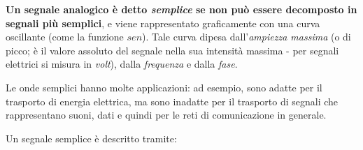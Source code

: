             \textbf{Un segnale analogico è detto \textit{semplice} se non può essere decomposto in segnali più semplici}, e viene rappresentato graficamente con una curva oscillante (come la funzione \(sen\)). Tale curva dipesa dall'\textit{ampiezza massima} (o di picco; è il valore assoluto del segnale nella sua intensità massima - per segnali elettrici si misura in \textit{volt}), dalla \textit{frequenza} e dalla \textit{fase}.
            
            \vspace{3mm}
            
            Le onde semplici hanno molte applicazioni: ad esempio, sono adatte per il trasporto di energia elettrica, ma sono inadatte per il trasporto di segnali che rappresentano suoni, dati e quindi per le reti di comunicazione in generale.
            
            \vspace{3mm}
            
            Un segnale semplice è descritto tramite:
            
